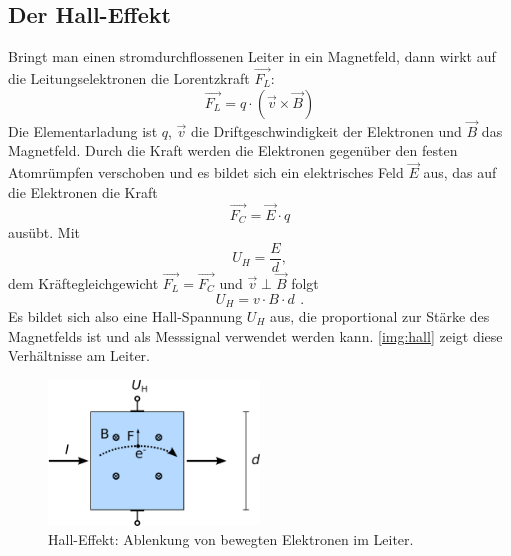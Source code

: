 \subsection{Der Hall-Effekt}
Bringt man einen stromdurchflossenen Leiter in ein Magnetfeld,
dann wirkt auf die Leitungselektronen die Lorentzkraft $\vec{F_L}$:
\begin{equation}
\label{eq:lorentz}
\vec{F_L} = q \cdot (\vec{v} \times \vec{B})
\end{equation}
Die Elementarladung ist $q$, $\vec{v}$ die Driftgeschwindigkeit der Elektronen und $\vec{B}$ das Magnetfeld.
Durch die Kraft werden die Elektronen gegenüber den festen Atomrümpfen verschoben und es
bildet sich ein elektrisches Feld $\vec{E}$ aus,
das auf die Elektronen die Kraft
\begin{equation}
\label{eq:Fe}
\vec{F_C} = \vec{E} \cdot q
\end{equation}
ausübt. Mit
\begin{equation}
\label{}
 U_H = \frac{E}{d},
\end{equation}
dem Kräftegleichgewicht $\vec{F_L} = \vec{F_C}$ und $\vec{v} \perp \vec{B}$ folgt
\begin{equation}
  U_H = v \cdot B \cdot d \ \, .
\end{equation}
Es bildet sich also eine Hall-Spannung $U_H$ aus, die proportional zur Stärke des Magnetfelds ist und
als Messsignal verwendet werden kann.
\autoref{img:hall} zeigt diese Verhältnisse am Leiter.

\begin{figure}[H]
\begin{center}
  \includegraphics[width=0.5\textwidth]{../img/hall.pdf}
  \caption{Hall-Effekt: Ablenkung von bewegten Elektronen im Leiter.}
  \label{img:hall}
\end{center}
\end{figure}